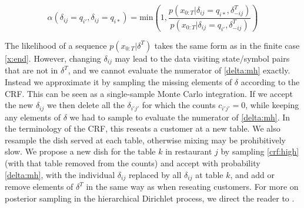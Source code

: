 {\begin{equation}
 \alpha(\delta_{ij}=q_{i'},\delta_{ij}=q_{i*}) =  \mathrm{min}\left(1,\frac{p(x_{0:T}|\delta_{ij}=q_{i*},\delta_{-ij}^T)}{p(x_{0:T}|\delta_{ij}=q_{i'},\delta_{-ij}^T)}\right) \label{delta:mh}
\end{equation}

The likelihood of a sequence $p(x_{0:T}|\delta^T)$ takes the same form as in the finite case \eqref{x:end}.  However, changing $\delta_{ij}$ may lead to the data visiting state/symbol pairs that are not in $\delta^T$, and we cannot evaluate the numerator of \eqref{delta:mh} exactly.  Instead we approximate it by sampling the missing elements of $\delta$ according to the CRF.  This can be seen as a single-sample Monte Carlo integration.  If we accept the new $\delta_{ij}$ we then delete all the $\delta_{i'j'}$ for which the counts $c_{i'j'} = 0$, while keeping any elements of $\delta$ we had to sample to evaluate the numerator of \eqref{delta:mh}.  In the terminology of the CRF, this reseats a customer at a new table.  We also resample the dish served at each table, otherwise mixing may be prohibitively slow.  We propose a new dish for the table $k$ in restaurant $j$ by sampling \eqref{crf:high} (with that table removed from the counts) and accept with probability \eqref{delta:mh}, with the individual $\delta_{ij}$ replaced by all $\delta_{ij}$ at table $k$, and add or remove elements of $\delta^T$ in the same way as when reseating customers.  For more on posterior sampling in the hierarchical Dirichlet process, we direct the reader to \cite{Teh2006}.
  }

 
 
 
 
